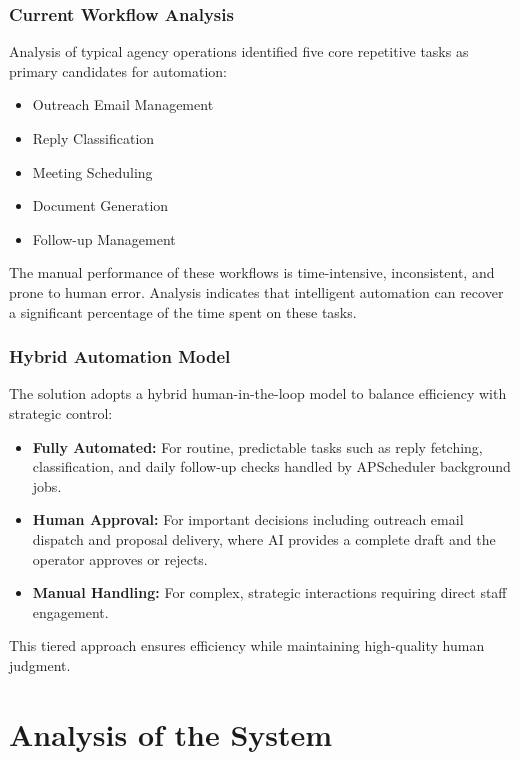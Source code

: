 \documentclass[12pt,a4paper]{report}
\begin{document}
\subsection{Current Workflow Analysis}
Analysis of typical agency operations identified five core repetitive tasks as primary candidates for automation:
\begin{itemize}
    \item Outreach Email Management
    \item Reply Classification
    \item Meeting Scheduling
    \item Document Generation
    \item Follow-up Management
\end{itemize}

The manual performance of these workflows is time-intensive, inconsistent, and prone to human error. Analysis indicates that intelligent automation can recover a significant percentage of the time spent on these tasks.

\subsection{Hybrid Automation Model}
The solution adopts a hybrid human-in-the-loop model to balance efficiency with strategic control:
\begin{itemize}
    \item \textbf{Fully Automated:} For routine, predictable tasks such as reply fetching, classification, and daily follow-up checks handled by APScheduler background jobs.
    \item \textbf{Human Approval:} For important decisions including outreach email dispatch and proposal delivery, where AI provides a complete draft and the operator approves or rejects.
    \item \textbf{Manual Handling:} For complex, strategic interactions requiring direct staff engagement.
\end{itemize}

This tiered approach ensures efficiency while maintaining high-quality human judgment.

\chapter{Analysis of the System}
\end{document}
